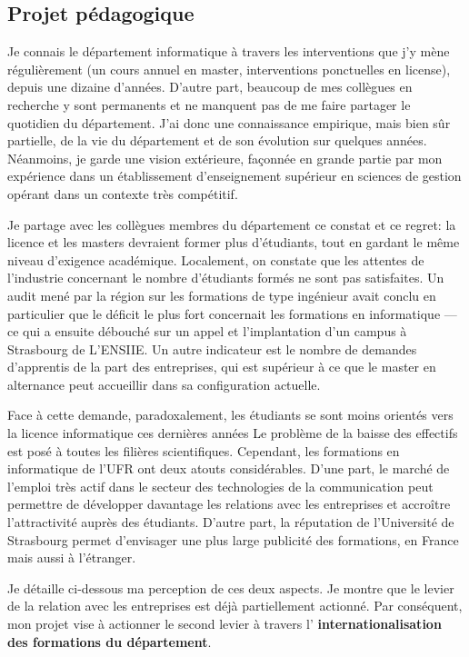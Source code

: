 \documentclass[11pt]{article}
\begin{document}
\subsection{Projet pédagogique}

Je connais le département informatique à travers les interventions que j'y mène
régulièrement (un cours annuel en master, interventions ponctuelles en license), 
depuis une dizaine d'années. D'autre part, beaucoup de mes collègues en recherche 
y sont permanents et ne manquent pas de me faire partager le quotidien du 
département. J'ai donc une connaissance empirique, mais bien sûr partielle, de 
la vie du département et de son évolution sur quelques années. Néanmoins, je 
garde une vision extérieure, façonnée en grande partie par mon expérience 
dans un établissement d'enseignement supérieur en sciences de gestion opérant 
dans un contexte très compétitif.

Je partage avec les collègues membres du département ce constat et ce regret: 
la licence et les masters devraient former plus d'étudiants, tout en gardant le 
même niveau d'exigence académique. Localement, on constate que les attentes de 
l'industrie concernant le nombre d'étudiants formés ne sont pas satisfaites. 
Un audit mené par la région sur les formations de type ingénieur avait conclu 
en particulier que le déficit le plus fort concernait les formations en 
informatique --- ce qui a ensuite débouché sur un appel et l'implantation
d'un campus à Strasbourg de L'ENSIIE. Un autre indicateur est le nombre de
demandes d'apprentis de la part des entreprises, qui est supérieur à ce que
le master en alternance peut accueillir dans sa configuration actuelle.

Face à cette demande, paradoxalement, les étudiants se sont moins orientés 
vers la licence informatique ces dernières années  Le problème de la baisse des 
effectifs est posé à toutes les filières scientifiques. Cependant, les 
formations en informatique de l'UFR ont deux atouts considérables. D'une part, 
le marché de l'emploi très actif dans le secteur des technologies de la 
communication peut permettre de développer davantage les relations avec les 
entreprises et accroître l'attractivité auprès des étudiants. D'autre part, 
la réputation de l'Université de Strasbourg permet d'envisager une 
plus large publicité des formations, en France mais aussi à l'étranger.

Je détaille ci-dessous ma perception de ces deux aspects. Je montre que le
levier de la relation avec les entreprises est déjà partiellement actionné.
Par conséquent, mon projet vise à actionner le second levier à travers l'%
\textbf{internationalisation des formations du département}.
\end{document}
